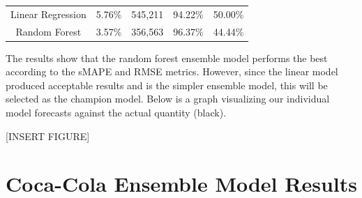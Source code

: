 \documentclass[12pt,oneside]{chicagocapstone}
\begin{document}
\begin{longtable}[]{@{}ccccc@{}}
\begin{minipage}[t]{0.27\columnwidth}\centering\strut
Linear Regression\strut
\end{minipage} & \begin{minipage}[t]{0.13\columnwidth}\centering\strut
5.76\%\strut
\end{minipage} & \begin{minipage}[t]{0.14\columnwidth}\centering\strut
545,211\strut
\end{minipage} & \begin{minipage}[t]{0.16\columnwidth}\centering\strut
94.22\%\strut
\end{minipage} & \begin{minipage}[t]{0.16\columnwidth}\centering\strut
50.00\%\strut
\end{minipage}\tabularnewline
\begin{minipage}[t]{0.27\columnwidth}\centering\strut
Random Forest\strut
\end{minipage} & \begin{minipage}[t]{0.13\columnwidth}\centering\strut
3.57\%\strut
\end{minipage} & \begin{minipage}[t]{0.14\columnwidth}\centering\strut
356,563\strut
\end{minipage} & \begin{minipage}[t]{0.16\columnwidth}\centering\strut
96.37\%\strut
\end{minipage} & \begin{minipage}[t]{0.16\columnwidth}\centering\strut
44.44\%\strut
\end{minipage}\tabularnewline
\bottomrule
\end{longtable}
The results show that the random forest ensemble model performs the best
according to the sMAPE and RMSE metrics. However, since the linear model
produced acceptable results and is the simpler ensemble model, this will
be selected as the champion model. Below is a graph visualizing our
individual model forecasts against the actual quantity (black).

{[}INSERT FIGURE{]}

\section*{Coca-Cola Ensemble Model
Results}\label{coca-cola-ensemble-model-results}
\end{document}
